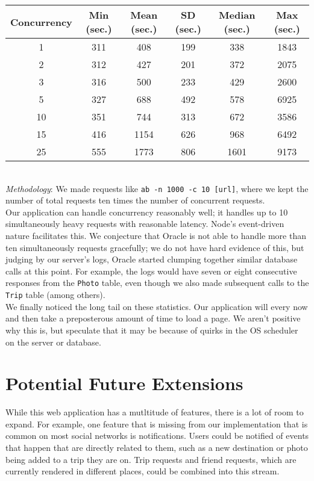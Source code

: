 \documentclass[11pt]{amsart}
\begin{document}
\begin{tabular}{|c|c|c|c|c|c|}
  \hline {\bf Concurrency} & {\bf Min (sec.)} & {\bf Mean (sec.)} & {\bf SD (sec.)} & 
    {\bf Median (sec.)} & {\bf Max (sec.)} \\
  \hline 1 & 311 & 408 & 199 & 338 & 1843 \\
  \hline 2 & 312 & 427 & 201 & 372 & 2075 \\
  \hline 3 & 316 & 500 & 233 & 429 & 2600 \\
  \hline 5 & 327 & 688 & 492 & 578 & 6925 \\
  \hline 10 & 351 & 744 & 313 & 672 & 3586 \\
  \hline 15 & 416 & 1154 & 626 & 968 & 6492 \\
  \hline 25 & 555 & 1773 & 806 & 1601 & 9173 \\
  \hline
\end{tabular} \\

{\em Methodology}: We made requests like {\tt ab -n 1000 -c 10 [url]}, where we kept the number of
total requests ten times the number of concurrent requests. \\

Our application can handle concurrency reasonably well; it handles up to 10 simultaneously heavy
requests with reasonable latency. Node's event-driven nature facilitates this. We conjecture that
Oracle is not able to handle more than ten simultaneously requests gracefully; we do not have
hard evidence of this, but judging by our server's logs, Oracle started clumping together similar
database calls at this point. For example, the logs would have seven or eight consecutive
responses from the {\tt Photo} table, even though we also made subsequent calls to the {\tt Trip}
table (among others). \\

We finally noticed the long tail on these statistics. Our application will every now and then take
a preposterous amount of time to load a page. We aren't positive why this is, but speculate that it
may be because of quirks in the OS scheduler on the server or database. \\

\section{Potential Future Extensions}
While this web application has a mutltitude of features, there is a lot of room to expand. For example, one
feature that is missing from our implementation that is common on most social networks is notifications.
Users could be notified of events that happen that are directly related to them, such as a new
destination or photo being added to a trip they are on. Trip requests and friend requests, which are currently
rendered in different places, could be combined into this stream.\\
\end{document}
